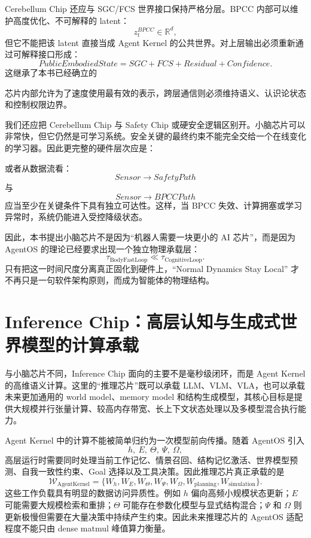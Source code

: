 Cerebellum Chip 还应与 SGC/FCS 世界接口保持严格分层。BPCC 内部可以维护高度优化、不可解释的 latent：
\[
z_t^{BPCC}\in\mathbb R^d,
\]
但它不能把该 latent 直接当成 Agent Kernel 的公共世界。对上层输出必须重新通过可解释接口形成：
\[
PublicEmbodiedState
=
SGC+FCS+Residual+Confidence.
\]
这继承了本书已经确立的
\begin{statementbox}
\centering
{}
\end{statementbox}
芯片内部允许为了速度使用最有效的表示，跨层通信则必须维持语义、认识论状态和控制权限边界。

我们还应把 Cerebellum Chip 与 Safety Chip 或硬安全逻辑区别开。小脑芯片可以非常快，但它仍然是可学习系统。安全关键的最终约束不能完全交给一个在线变化的学习器。因此更完整的硬件层次应是：
\begin{statementbox}
\centering
{}
\end{statementbox}
或者从数据流看：
\[
Sensor
\rightarrow
SafetyPath
\]
与
\[
Sensor
\rightarrow
BPCCPath
\]
应当至少在关键条件下具有独立可达性。这样，当 BPCC 失效、计算拥塞或学习异常时，系统仍能进入受控降级状态。

因此，本书提出小脑芯片不是因为“机器人需要一块更小的 AI 芯片”，而是因为 AgentOS 的理论已经要求出现一个独立物理承载层：
\[
\boxed{
\tau_{\mathrm{BodyFastLoop}}
\ll
\tau_{\mathrm{CognitiveLoop}}.
}
\]
只有把这一时间尺度分离真正固化到硬件上，``Normal Dynamics Stay Local'' 才不再只是一句软件架构原则，而成为智能体的物理结构。

\section{Inference Chip：高层认知与生成式世界模型的计算承载}

与小脑芯片不同，Inference Chip 面向的主要不是毫秒级闭环，而是 Agent Kernel 的高维语义计算。这里的“推理芯片”既可以承载 LLM、VLM、VLA，也可以承载未来更加通用的 world model、memory model 和结构生成模型，其核心目标是提供大规模并行张量计算、较高内存带宽、长上下文状态处理以及多模型混合执行能力。

Agent Kernel 中的计算不能被简单归约为一次模型前向传播。随着 AgentOS 引入
\[
h,\ E,\ \Theta,\ \Psi,\ \Omega,
\]
高层运行时需要同时处理当前工作记忆、情景召回、结构记忆激活、世界模型预测、自我一致性约束、Goal 选择以及工具决策。因此推理芯片真正承载的是
\[
\mathcal W_{\mathrm{AgentKernel}}
=
\{
W_h,
W_E,
W_\Theta,
W_\Psi,
W_\Omega,
W_{\mathrm{planning}},
W_{\mathrm{simulation}}
\}.
\]
这些工作负载具有明显的数据访问异质性。例如 $h$ 偏向高频小规模状态更新；$E$ 可能需要大规模检索和重排；$\Theta$ 可能存在参数化模型与显式结构混合；$\Psi$ 和 $\Omega$ 则更新极慢但需要在大量决策中持续产生约束。因此未来推理芯片的 AgentOS 适配程度不能只由 dense matmul 峰值算力衡量。

